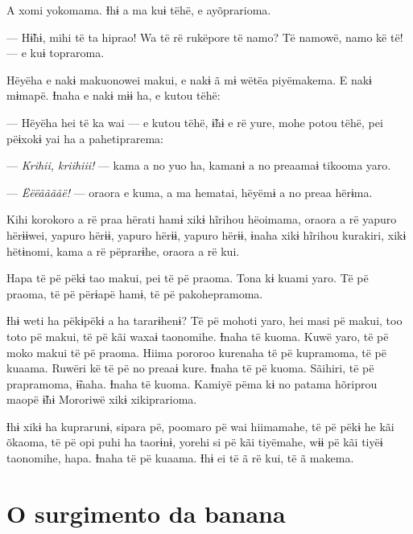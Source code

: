 A xomi yokomama. Ɨhɨ a ma kuɨ tëhë, e ayõprarioma. 

--- Hɨ̃hɨ, mihi të ta hiprao! Wa të rë rukëpore të namo? Të namowë, namo kë
të! --- e kuɨ topraroma. 

Hëyëha e nakɨ makuonowei makui, e nakɨ ã mɨ wëtëa piyëmakema. E nakɨ
mɨmapë. Ɨnaha e nakɨ mɨɨ ha, e kutou tëhë: 

--- Hëyëha hei të ka wai --- e kutou tëhë, ɨ̃hɨ e rë yure, mohe potou tëhë,
pei pëɨxokɨ yai ha a pahetiprarema:

--- \textit{Krihii, kriihiii!} --- kama a no yuo ha, kamanɨ a no preaamaɨ tikooma
yaro. 

--- \textit{Ëëëããããë!} --- oraora e kuma, a ma hematai, hëyëmɨ a no preaa hërɨma. 

Kihi korokoro a rë praa hërati hamɨ xikɨ hĩrihou hëoimama, oraora a rë
yapuro hërɨɨwei, yapuro hërɨɨ, yapuro hërɨɨ, yapuro hërɨɨ, ɨnaha xikɨ
hĩrihou kurakiri, xikɨ hëtɨnomi, kama a rë pëprarɨhe, oraora a rë kui. 


Hapa të pë pëkɨ tao makui, pei të pë praoma. Tona kɨ kuami yaro. Të pë
praoma, të pë përɨapë hamɨ, të pë pakohepramoma. 

Ɨhɨ weti ha pëkɨpëkɨ a ha tararɨhenɨ? Të pë mohoti yaro, hei masi pë
makui, too toto pë makui, të pë kãi waxaɨ taonomihe. Ɨnaha të kuoma.
Kuwë yaro, të pë moko makui të pë praoma. Hiima pororoo kurenaha të pë
kupramoma, të pë kuaama. Ruwëri kë të pë no preaaɨ kure. Ɨnaha të pë
kuoma. Sãihiri, të pë prapramoma, ɨ̃naha. Ɨnaha të kuoma. Kamiyë pëma kɨ
no patama hõriprou maopë ɨ̃hɨ Mororiwë xikɨ xikiprarioma. 

Ɨhɨ xikɨ ha kuprarunɨ, sipara pë, poomaro pë wai hiimamahe, të pë pëkɨ
he kãi õkaoma, të pë opi puhi ha taorɨnɨ, yorehi si pë kãi tiyëmahe, wɨɨ
pë kãi tiyëɨ taonomihe, hapa. Ɨnaha të pë kuaama. Ɨhɨ ei të ã rë kui, të
ã makema.

\chapter{O surgimento da banana}
 
